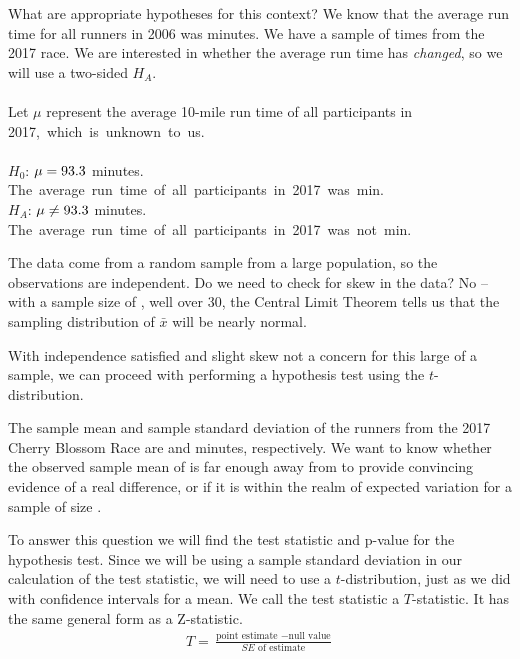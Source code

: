\begin{examplewrap}
\begin{nexample}
{What are appropriate hypotheses for this context?}
We know that the average run time for all runners in 2006 was \cherryblossomnull{} minutes.  We have a sample of times from the 2017 race.  We are interested in whether the average run time has \emph{changed}, so we will use a two-sided $H_A$.\\
\\
Let $\mu$ represent the average 10-mile run time of all participants in 2017,\mbox{ which is unknown to us.}
\\
\\
$H_0$: $\mu = 93.3{}$ minutes. \mbox{The average run time of all participants in 2017 was \cherryblossomnull{} min.}
\\$H_A$: $\mu \neq 93.3{}$ minutes. \mbox{The average run time of all participants in 2017 was not \cherryblossomnull{} min.}
\end{nexample}
\end{examplewrap}

The data come from a random sample from a large population, so the observations are independent. Do we need to check for skew in the data? No -- with a sample size of \cherryblossomn{}, well over 30, the Central Limit Theorem tells us that the sampling distribution of $\bar{x}$ will be nearly normal.

With independence satisfied and slight skew not a concern for this large of a sample, we can proceed with performing a hypothesis test using the $t$-distribution.

The sample mean and sample standard deviation of the \cherryblossomn{} runners from the 2017 Cherry Blossom Race are \cherryblossommean{} and \cherryblossomsd{} minutes, respectively. We want to know whether the observed sample mean of \cherryblossommean{} is far enough away from \cherryblossomnull{} to provide convincing evidence of a real difference, or if it is within the realm of expected variation for a sample of size \cherryblossomn{}.  

\D{\newpage}

To answer this question we will find the test statistic and p-value for the hypothesis test.  Since we will be using a sample standard deviation in our calculation of the test statistic, we will need to use a $t$-distribution, just as we did with confidence intervals for a mean.  We call the test statistic a $T$-statistic.  It has the same general form as a Z-statistic.
\begin{align*}
T = \frac{\text{point estimate } - \text{null value}}{SE\text{ of estimate}}
\end{align*}

